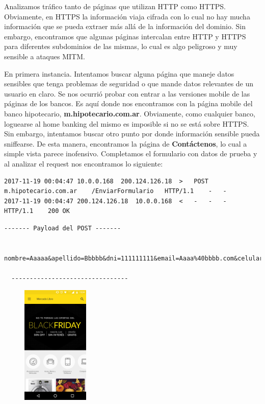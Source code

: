 Analizamos tráfico tanto de páginas que utilizan HTTP como HTTPS. Obviamente, en HTTPS la información viaja cifrada con lo cual no hay mucha información que 
se pueda extraer más allá de la información del dominio. Sin embargo, encontramos que algunas páginas intercalan entre HTTP y HTTPS para diferentes subdominios 
de las mismas, lo cual es algo peligroso y muy sensible a ataques MITM.

En primera instancia. Intentamos buscar alguna página que maneje datos sensibles que tenga problemas de seguridad o que mande datos relevantes de un usuario 
en claro. Se nos ocurrió probar con entrar a las versiones mobile de las páginas de los bancos. Es aquí donde nos encontramos con la página mobile del 
banco hipotecario, \textbf{m.hipotecario.com.ar}. Obviamente, como cualquier banco, loguearse al home banking del mismo es imposible si no se está sobre HTTPS. 
Sin embargo, intentamos buscar otro punto por donde información sensible pueda sniffearse. De esta manera, encontramos la página de \textbf{Contáctenos}, lo cual 
a simple vista parece inofensivo. Completamos el formulario con datos de prueba y al analizar el request nos encontramos lo siguiente:

\begin{lstlisting}[style=base]
2017-11-19 00:04:47	10.0.0.168	200.124.126.18	>	POST	m.hipotecario.com.ar	/EnviarFormulario	HTTP/1.1	-	-
2017-11-19 00:04:47	200.124.126.18	10.0.0.168	<	-	-	-	HTTP/1.1	200	OK
\end{lstlisting}


\begin{lstlisting}[style=base]
  ------- Payload del POST -------

  nombre=Aaaaa&apellido=Bbbbb&dni=111111111&email=Aaaa%40bbbb.com&celular=11111111&consulta=Test+%7C+Es+Cliente&CaptchaCode=052&EncData=%2FCJ15Ehz0%2BK6sKWFhkwafRVmAm5t2TOT

  --------------------------------
\end{lstlisting}


\begin{figure}
    \centering
    \includegraphics[width=3.2cm]{img/ml.png}
\end{figure}

